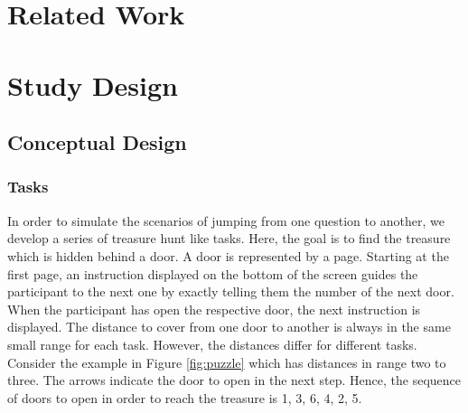 \documentclass{sig-alternate-05-2015}
\begin{document}
\section{Related Work}

\section{Study Design}
\subsection{Conceptual Design}
\subsubsection{Tasks}
In order to simulate the scenarios of jumping from one question to another, we develop a series of treasure hunt like tasks. Here, the goal is to find the treasure which
is hidden behind a door. A door is represented by a page. Starting at the first page, an instruction displayed on the bottom of the screen guides the participant to the next one 
by exactly telling them the number of the next door. When the participant has open the respective door, the next
instruction is displayed. The distance to cover from one door to another is always in the same small range for each task. However, the distances differ for
different tasks. Consider the example in Figure \ref{fig:puzzle} which has distances in range two to three. The arrows indicate the door to open in
the next step. Hence, the sequence of doors to open in order to reach the treasure is 1, 3, 6, 4, 2, 5. 
\end{document}
